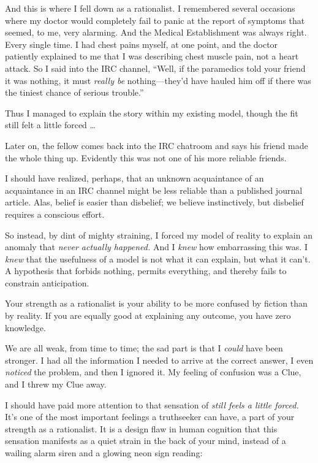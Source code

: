 {
 And this is where I fell down as a rationalist. I remembered
several occasions where my doctor would completely fail to panic at the
report of symptoms that seemed, to me, very alarming. And the Medical
Establishment was always right. Every single time. I had chest pains
myself, at one point, and the doctor patiently explained to me that I
was describing chest muscle pain, not a heart attack. So I said into
the IRC channel, ``Well, if the paramedics told your
friend it was nothing, it must \textit{really be}
nothing---they'd have hauled him off if there was the
tiniest chance of serious trouble.''}

{
 Thus I managed to explain the story within my existing model,
though the fit still felt a little forced \ldots}

{
 Later on, the fellow comes back into the IRC chatroom and says his
friend made the whole thing up. Evidently this was not one of his more
reliable friends.}

{
 I should have realized, perhaps, that an unknown acquaintance of
an acquaintance in an IRC channel might be less reliable than a
published journal article. Alas, belief is easier than disbelief; we
believe instinctively, but disbelief requires a conscious
effort.}

{
 So instead, by dint of mighty straining, I forced my model of
reality to explain an anomaly that \textit{never actually happened.}
And I \textit{knew} how embarrassing this was. I \textit{knew} that the
usefulness of a model is not what it can explain, but what it
can't. A hypothesis that forbids nothing, permits
everything, and thereby fails to constrain anticipation.}

{
 Your strength as a rationalist is your ability to be more confused
by fiction than by reality. If you are equally good at explaining any
outcome, you have zero knowledge.}

{
 We are all weak, from time to time; the sad part is that I
\textit{could} have been stronger. I had all the information I needed
to arrive at the correct answer, I even \textit{noticed} the problem,
and then I ignored it. My feeling of confusion was a Clue, and I threw
my Clue away.}

{
 I should have paid more attention to that sensation of
\textit{still feels a little forced.} It's one of the
most important feelings a truthseeker can have, a part of your strength
as a rationalist. It is a design flaw in human cognition that this
sensation manifests as a quiet strain in the back of your mind, instead
of a wailing alarm siren and a glowing neon sign reading:}

